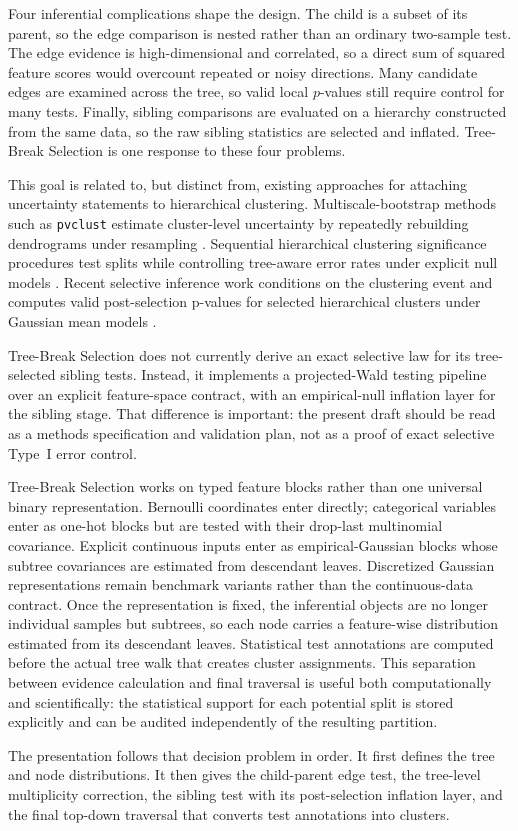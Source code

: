 Four inferential complications shape the design. The child is a subset of its
parent, so the edge comparison is nested rather than an ordinary two-sample
test. The edge evidence is high-dimensional and correlated, so a direct sum of
squared feature scores would overcount repeated or noisy directions. Many candidate edges
are examined across the tree, so valid local $p$-values still require control
for many tests. Finally, sibling comparisons are evaluated on a hierarchy
constructed from the same data, so the raw sibling statistics are selected and
inflated. Tree-Break Selection is one response to these four problems.

This goal is related to, but distinct from, existing approaches for attaching
uncertainty statements to hierarchical clustering. Multiscale-bootstrap methods
such as \texttt{pvclust} estimate cluster-level uncertainty by repeatedly
rebuilding dendrograms under resampling \citep{suzuki2006pvclust}. Sequential
hierarchical clustering significance procedures test splits while controlling
tree-aware error rates under explicit null models \citep{kimes2017statistical}.
Recent selective inference work conditions on the clustering event and computes
valid post-selection p-values for selected hierarchical clusters under Gaussian
mean models \citep{gao2024selective}.

Tree-Break Selection does not currently derive an exact selective law for its tree-selected
sibling tests. Instead, it implements a projected-Wald testing pipeline over an
explicit feature-space contract, with an empirical-null inflation layer for the
sibling stage. That difference is important: the present draft should be read as
a methods specification and validation plan, not as a proof of exact selective
Type~I error control.

Tree-Break Selection works on typed feature blocks rather than one universal binary
representation. Bernoulli coordinates enter directly; categorical variables
enter as one-hot blocks but are tested with their drop-last multinomial
covariance. Explicit continuous inputs enter as empirical-Gaussian blocks whose
subtree covariances are estimated from descendant leaves. Discretized Gaussian
representations remain benchmark variants rather than the continuous-data
contract.
Once the representation is fixed, the inferential objects are no longer
individual samples but subtrees, so each node carries a feature-wise
distribution estimated from its descendant leaves. Statistical test annotations
are computed before the actual tree walk that creates cluster assignments. This
separation between evidence calculation and final traversal is useful both
computationally and scientifically: the statistical support for each potential
split is stored explicitly and can be audited independently of the resulting
partition.

The presentation follows that decision problem in order. It first defines the
tree and node distributions. It then gives the child-parent edge test, the
tree-level multiplicity correction, the sibling test with its post-selection
inflation layer, and the final top-down traversal that converts test
annotations into clusters.
